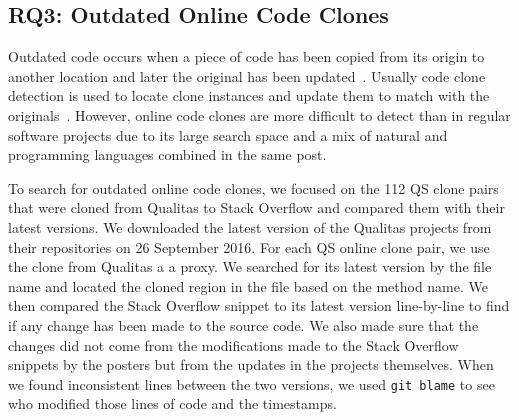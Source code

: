 \documentclass[sigconf,review, anonymous]{acmart}
\begin{document}
\subsection{RQ3: Outdated Online Code Clones}


Outdated code occurs when a piece of code has been copied from its origin to another location and later the original has been updated~\cite{Xia2014}. Usually code clone detection is used to locate clone instances and update them to match with the originals~\cite{Bellon2007}. However, online code clones are more difficult to detect than in regular software projects due to its large search space and a mix of natural and programming languages combined in the same post. 

To search for outdated online code clones, we focused on the 112 QS clone pairs that were cloned from Qualitas to Stack Overflow and compared them with their latest versions. We downloaded the latest version of the Qualitas projects from their repositories on 26 September 2016. For each QS online clone pair, we use the clone from Qualitas a a proxy. We searched for its latest version by the file name and located the cloned region in the file based on the method name. 
We then compared the Stack Overflow snippet to its latest version line-by-line to find if any change has been made to the source code. We also made sure that the changes did not come from the modifications made to the Stack Overflow snippets by the posters but from the updates in the projects themselves. When we found inconsistent lines between the two versions, we used {\small\texttt{git blame}} to see who modified those lines of code and the timestamps.
\end{document}
